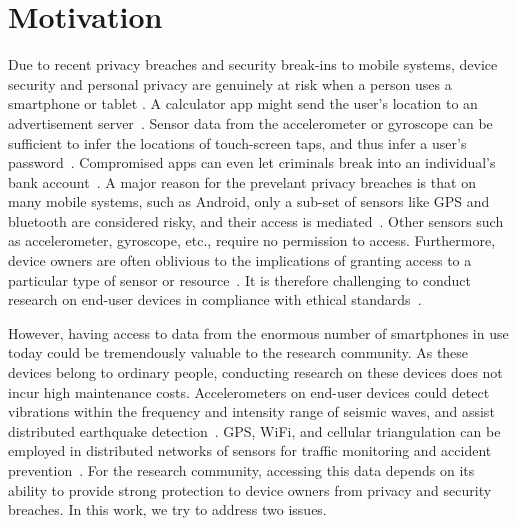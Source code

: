 \section{Motivation}\label{sec-motivation}

Due to recent privacy breaches and security break-ins to mobile systems, 
device security and personal privacy are genuinely at risk when a person 
uses a smartphone or tablet \cite{breach}. 
A calculator app might send the user's location to an advertisement 
server~\cite{calc}. Sensor data from the accelerometer 
or gyroscope can be sufficient to infer the locations of touch-screen 
taps, and thus infer a user's password~\cite{cai2011touchlogger}.
Compromised apps can even let criminals break into an individual's 
bank account~\cite{starbucks}. 
A major reason for the prevelant privacy breaches is that on many mobile 
systems, such as Android, 
only a sub-set of sensors like GPS and bluetooth are considered risky, 
and their access is mediated~\cite{android-sec}. Other sensors 
such as accelerometer, gyroscope, etc., 
require no permission to access. Furthermore, %
device owners are often oblivious to the implications of granting access to
a particular type of sensor or resource~\cite{felt2012android}. It is 
therefore challenging to conduct research on end-user devices
in compliance with ethical standards~\cite{zevenbergen2013ethical}.

However, having access to data from the enormous number of smartphones 
in use today could be tremendously valuable to the research 
community. As these devices belong to ordinary people, conducting
research on these devices does not incur high maintenance costs. 
Accelerometers on end-user devices could detect vibrations within 
the frequency and intensity range of seismic waves, and assist 
distributed earthquake detection~\cite{faulkner2011next}. GPS, 
WiFi, and cellular triangulation can be employed in distributed 
networks of sensors for traffic monitoring and accident 
prevention~\cite{mohan2008nericell, thiagarajan2009vtrack}. 
For the research community, accessing this data depends on its 
ability to provide strong protection to device owners from privacy 
and security breaches. In this work, we try to address two issues. 

